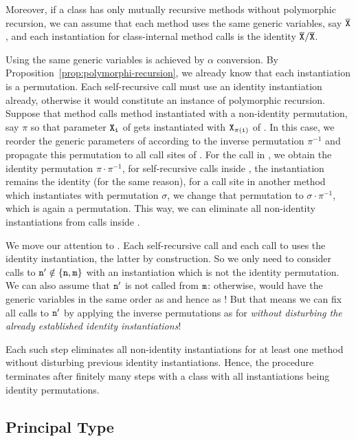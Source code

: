 Moreover, if a class has only mutually recursive methods without
polymorphic recursion, we can assume that each method uses the same
generic variables, say $\overline{\tt X}$, and each instantiation for
class-internal method calls is the identity $\overline{\tt X}/\overline{\tt X}$.

Using the same generic variables is achieved by $\alpha$ conversion.
By Proposition~\ref{prop:polymorphi-recursion}, we already know that
each instantiation is a permutation. Each self-recursive call must use
an identity instantiation already, otherwise it would constitute an
instance of polymorphic recursion. Suppose that method  calls
method  instantiated with a non-identity permutation, say
$\pi$ so that parameter ${\tt X_i}$ of  gets instantiated with
${\tt X_{\pi(i)}}$ of . In this case, we reorder the generic
parameters of   according to the inverse permutation
$\pi^{-1}$ and propagate this permutation to all call sites of
. For the call in , we obtain the identity permutation
$\pi \cdot \pi^{-1}$, for self-recursive calls inside , the
instantiation remains the identity (for the same reason), for a
call site in another method which instantiates  with permutation
$\sigma$, we change that permutation to $\sigma \cdot \pi^{-1}$, which
is again a permutation.
This way, we can eliminate all non-identity instantiations from calls
inside .

We move our attention to . Each self-recursive call and each call to  uses the
identity instantiation, the latter by construction. So we only need to
consider calls to ${\tt n'}\notin\{{\tt n}, {\tt m}\}$ with an
instantiation which is not the identity permutation. We can also
assume that ${\tt n'}$ is not called from ${\tt m}$: otherwise, 
would have the generic variables in the same order as  and hence
as ! But that means we can fix all calls to ${\tt n'}$ by
applying the inverse permutations as for  \emph{without disturbing the already
  established identity instantiations}!

Each such step eliminates all non-identity instantiations for at least
one method without disturbing previous identity instantiations. Hence,
the procedure terminates after finitely many steps with a class with
all instantiations being identity permutations.


\subsection{Principal Type}

